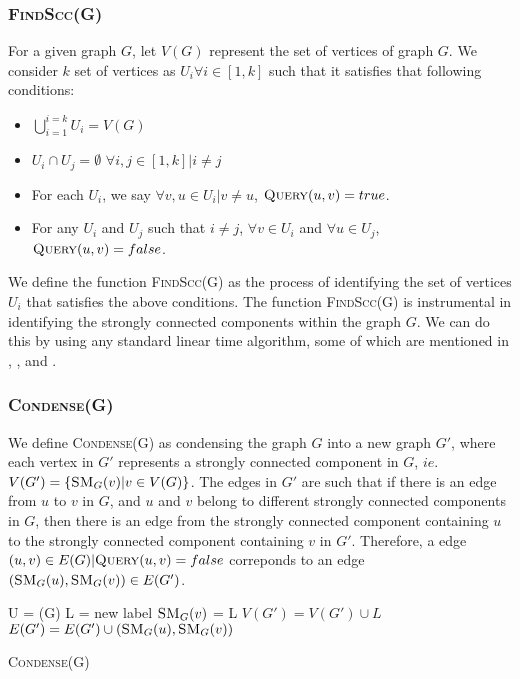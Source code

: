 \subsubsection{\textsc{FindScc}(G)}\label{Subsubsec: FindScc}
For a given graph $G$, let $V(G)$ represent the set of vertices of graph $G$.
We consider $k$ set of vertices as $U_i \forall i \in [1,k]$ such that it satisfies that following conditions:
\begin{itemize}
    \item $\bigcup\limits_{i=1}^{i=k}U_i = V(G)$
    \item $U_i \cap U_j = \emptyset$  $\forall i, j \in [1,k] | i \neq j$
    \item For each $U_i$, we say $\forall v, u \in U_i | v \neq u$, $\text{\textsc{Query}}(u, v) = true$.
    \item For any $U_i$ and $U_j$ such that $i \neq j$, $\forall v \in U_i$ and $\forall u \in U_j$, $\text{\textsc{Query}}(u, v) = false$.
\end{itemize}
We define the function \textsc{FindScc}(G) as the process of identifying the set of vertices $U_i$ that satisfies the above conditions.
The function \textsc{FindScc}(G) is instrumental in identifying the strongly connected components within the graph $G$.
We can do this by using any standard linear time algorithm, some of which are mentioned in \cite{find_scc_algorithm}, \cite{Kosaraju}, and \cite{DBLP:journals/corr/abs-2201-07197}.

\subsubsection{\textsc{Condense}(G)}\label{Subsubsec: Condense}

We define \textsc{Condense}(G) as condensing the graph $G$ into a new graph $G'$, where each vertex in $G'$ represents a strongly connected component in $G$,
$ie.$ $V(G') = \{\text{\textsc{SM}}_G(v) | v \in V(G)\}$.
The edges in $G'$ are such that if there is an edge from $u$ to $v$ in $G$, and $u$ and $v$ belong to different strongly connected components in $G$,
then there is an edge from the strongly connected component containing $u$ to the strongly connected component containing $v$ in $G'$. 
Therefore, a edge $(u, v) \in E(G) | \text{\textsc{Query}}(u, v) = false$ correponds to an edge $(\text{\textsc{SM}}_{G}(u), \text{\textsc{SM}}_{G}(v)) \in E(G')$.

\begin{algorithm}[H]
    \SetAlgoLined
    U = (G)\;
     {
        L = new label\;
         {
            $\text{\textsc{SM}}_G(v)$ = L\;
        }
        $V(G') = V(G')\cup L$
    }
     {
         {
            $E(G') = E(G') \cup (\text{\textsc{SM}}_G(u), \text{\textsc{SM}}_G(v))$
        }
    }
    \caption{\textsc{Condense}(G)}
\end{algorithm}

